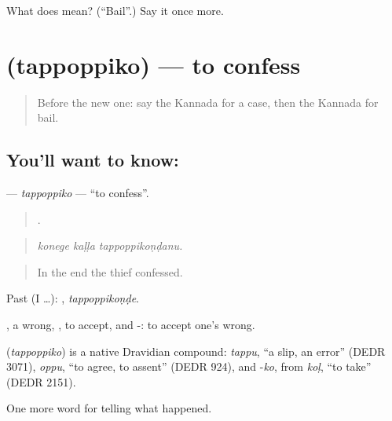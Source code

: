 \begin{tcolorbox}[breakable,colback=teal!4,colframe=teal!35!black,title={Before you move on}]
What does  mean? (\textquotedblleft{}Bail\textquotedblright{}.) Say it once more.
\end{tcolorbox}
\section[\texorpdfstring{\kn{ತಪ್ಪೊಪ್ಪಿಕೊ} (tappoppiko)}{ತಪ್ಪೊಪ್ಪಿಕೊ (tappoppiko)}]{ (tappoppiko) — to confess}

\label{lesson:KA-C358-tappoppiko}



\begin{quote}
Before the new one: say the Kannada for a case, then the Kannada for bail.
\end{quote}

\subsection*{You'll want to know: }
\textbf{} — \emph{tappoppiko} — \textquotedblleft{}to confess\textquotedblright{}.

\begin{quote}
  .
\end{quote}

\begin{quote}
\emph{konege kaḷḷa tappoppikoṇḍanu.}
\end{quote}

\begin{quote}
In the end the thief confessed.
\end{quote}

Past (I …): , \emph{tappoppikoṇḍe}.

, a wrong, , to accept, and -: to accept one's wrong.

\begin{cousinweb}
\textbf{} (\emph{tappoppiko}) is a native Dravidian compound: \emph{tappu}, \textquotedblleft{}a slip, an error\textquotedblright{} (DEDR 3071), \emph{oppu}, \textquotedblleft{}to agree, to assent\textquotedblright{} (DEDR 924), and -\emph{ko}, from \emph{koḷ}, \textquotedblleft{}to take\textquotedblright{} (DEDR 2151).
\end{cousinweb}

\begin{grammarlens}[title={What you've built}]
One more word for telling what happened.
\end{grammarlens}

